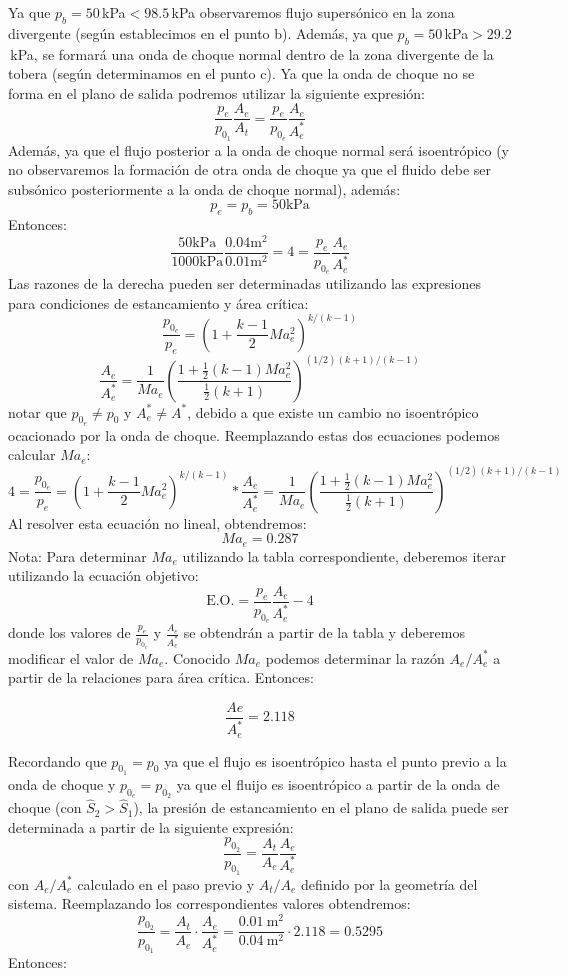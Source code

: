 \documentclass[11pt]{report}
\begin{document}
Ya que $p_b=50$\,kPa$<98.5$\,kPa observaremos flujo supers\'onico en la zona divergente (seg\'un establecimos en el punto b). Adem\'as, ya que $p_b=50$\,kPa$>29.2$\,kPa, se formar\'a una onda de choque normal dentro de la zona divergente de la tobera (seg\'un determinamos en el punto c). Ya que la onda de choque no se forma en el plano de salida podremos utilizar la siguiente expresi\'on:
$$
\frac{p_{e}}{p_{0_{1}}} \frac{A_{e}}{A_{t}}=\frac{p_{e}}{p_{0_{e}}} \frac{A_{e}}{A_{e}^{*}}
$$
Adem\'as, ya que el flujo posterior a la onda de choque normal ser\'a isoentr\'opico (y no observaremos la formaci\'on de otra onda de choque ya que el fluido debe ser subs\'onico posteriormente a la onda de choque normal), adem\'as:
$$p_e=p_b=50\mathrm{kPa}$$
Entonces:
$$
\frac{50\mathrm{kPa}}{1000\mathrm{kPa}} \frac{0.04\mathrm{m}^2}{0.01\mathrm{m}^2}=4=\frac{p_{e}}{p_{0_{e}}} \frac{A_{e}}{A_{e}^{*}}
$$
Las razones de la derecha pueden ser determinadas utilizando las expresiones para condiciones de estancamiento y \'area cr\'itica:
$$
\frac{p_{0_e}}{p_e}=\left(1+\frac{k-1}{2} M a_e^{2}\right)^{k /(k-1)}
$$
$$
\frac{A_e}{A^{*}_e}=\frac{1}{M a_e}\left(\frac{1+\frac{1}{2}(k-1) M a_e^{2}}{\frac{1}{2}(k+1)}\right)^{(1 / 2)(k+1) /(k-1)}
$$
notar que $p_{0_e}\neq p_0$ y $A_e^*\neq A^*$, debido a que existe un cambio no isoentr\'opico ocacionado por la onda de choque. Reemplazando estas dos ecuaciones podemos calcular $Ma_e$:
 $$4=\frac{p_{0_e}}{p_e}=\left(1+\frac{k-1}{2} M a_e^{2}\right)^{k /(k-1)}*\frac{A_e}{A^{*}_e}=\frac{1}{M a_e}\left(\frac{1+\frac{1}{2}(k-1) M a_e^{2}}{\frac{1}{2}(k+1)}\right)^{(1 / 2)(k+1) /(k-1)}$$
Al resolver esta ecuaci\'on no lineal, obtendremos:
$$Ma_e=0.287$$
Nota: Para determinar $Ma_e$ utilizando la tabla correspondiente, deberemos iterar utilizando la ecuaci\'on objetivo:
$$\text{E.O.}=\frac{p_{e}}{p_{0_{e}}} \frac{A_{e}}{A_{e}^{*}}-4
$$
donde los valores de $\frac{p_{e}}{p_{0_{e}}}$ y $\frac{A_{e}}{A_{e}^{*}}$ se obtendr\'an a partir de la tabla y deberemos modificar el valor de $Ma_e$. 
Conocido $Ma_e$ podemos determinar la raz\'on $A_e/A_e^*$ a partir de la relaciones para \'area cr\'itica. Entonces:


$$
\frac{A e}{A_{e}^{*}}=2.118
$$

Recordando que $p_{0_1}=p_0$ ya que el flujo es isoentr\'opico hasta el punto previo a la onda de choque y $p_{0_e}=p_{0_2}$ ya que el fluijo es isoentr\'opico a partir de la onda de choque (con $\hat{S}_2>\hat{S}_1$), la presi\'on de estancamiento en el plano de salida puede ser determinada a partir de la siguiente expresi\'on:
$$
\frac{p_{0_2}}{p_{0_{1}}}=\frac{A_{t}}{A_{e}} \frac{A_{e}}{A_{e}^{*}}
$$
con $A_e/A_e^*$ calculado en el paso previo y $A_t/A_e$ definido por la geometr\'ia del sistema. Reemplazando los correspondientes valores obtendremos:
$$
\frac{p_{0_2}}{p_{0_{1}}}=\frac{A_{t}}{A_{e}} \cdot \frac{A_{e}}{A _e^{*}}=\frac{0.01 \mathrm{~m}^{2}}{0.04 \mathrm{~m}^{2}} \cdot 2.118=0.5295
$$ 
Entonces:
\end{document}
